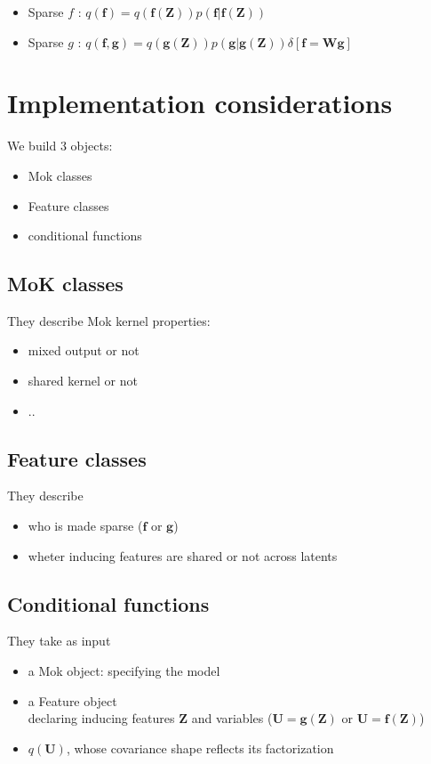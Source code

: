 \documentclass[12pt]{article}
\newcommand{\vf}{\mathbf{f}}
\newcommand{\vg}{\mathbf{g}}
\newcommand{\vW}{\mathbf{W}}
\newcommand{\vZ}{\mathbf{Z}}
\newcommand{\vU}{\mathbf{U}}
\begin{document}
\begin{itemize}
\item Sparse $f$ : $q(\vf) = q(\vf(\vZ))p(\vf|\vf(\vZ))$
\item Sparse $g$ : $q(\vf,\vg) = q(\vg(\vZ))p(\vg|\vg(\vZ))\delta[\vf= \vW \vg]$
\end{itemize}



\section{Implementation considerations}

We build 3 objects:

\begin{itemize}
\item Mok classes
\item Feature classes 
\item conditional functions
\end{itemize}

\subsection{MoK classes}

They describe Mok kernel properties:
\begin{itemize}
\item mixed output or not
\item shared kernel or not
\item ..
\end{itemize} 

\subsection{Feature classes}

They describe 
\begin{itemize}
\item who is made sparse ($\vf$ or $\vg$)
\item wheter inducing features are shared or not across latents
\end{itemize}  

\subsection{Conditional functions}

They take as input 
\begin{itemize}
\item a Mok object: specifying the model
\item a Feature object\\ declaring inducing features $\vZ$ and variables ($\vU=\vg(\vZ)$ or $\vU=\vf(\vZ)$)
\item $q(\vU)$, whose covariance shape reflects its factorization 
\end{itemize}  
\end{document}

